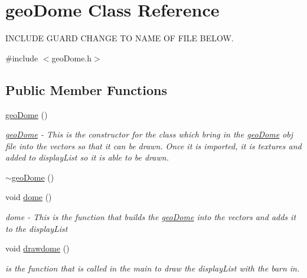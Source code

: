 \hypertarget{classgeoDome}{
\section{geoDome Class Reference}
\label{classgeoDome}
}


INCLUDE GUARD CHANGE TO NAME OF FILE BELOW.  


{\ttfamily \#include $<$geoDome.h$>$}\subsection*{Public Member Functions}
\begin{DoxyCompactItemize}
\item 
\hypertarget{classgeoDome_a32a961e83eb3ae8865a3c96dba142bcc}{
\hyperlink{classgeoDome_a32a961e83eb3ae8865a3c96dba142bcc}{geoDome} ()}
\label{classgeoDome_a32a961e83eb3ae8865a3c96dba142bcc}

\begin{DoxyCompactList}\small\item\em \hyperlink{classgeoDome}{geoDome} -\/ This is the constructor for the class which bring in the \hyperlink{classgeoDome}{geoDome} obj file into the vectors so that it can be drawn. Once it is imported, it is textures and added to displayList so it is able to be drawn. \item\end{DoxyCompactList}\item 
\hyperlink{classgeoDome_aa4b805a9a85dfd8eb9d8c815c15621d2}{$\sim$geoDome} ()
\item 
\hypertarget{classgeoDome_ac8026e6efe815bbe9e56713aaae3019e}{
void \hyperlink{classgeoDome_ac8026e6efe815bbe9e56713aaae3019e}{dome} ()}
\label{classgeoDome_ac8026e6efe815bbe9e56713aaae3019e}

\begin{DoxyCompactList}\small\item\em dome -\/ This is the function that builds the \hyperlink{classgeoDome}{geoDome} into the vectors and adds it to the displayList \item\end{DoxyCompactList}\item 
\hypertarget{classgeoDome_ab6fb46e137fb095789a1792e4de50f88}{
void \hyperlink{classgeoDome_ab6fb46e137fb095789a1792e4de50f88}{drawdome} ()}
\label{classgeoDome_ab6fb46e137fb095789a1792e4de50f88}

\begin{DoxyCompactList}\small\item\em is the function that is called in the main to draw the displayList with the barn in. \item\end{DoxyCompactList}\end{DoxyCompactItemize}
